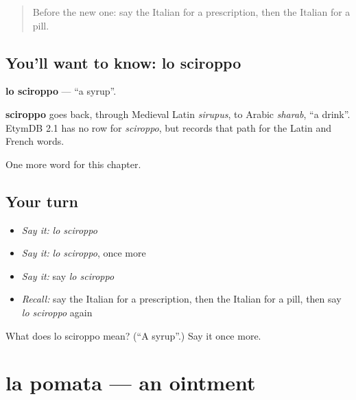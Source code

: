 \label{lesson:IT-C215-sciroppo}



\begin{quote}
Before the new one: say the Italian for a prescription, then the Italian for a pill.
\end{quote}

\subsection*{You'll want to know: lo sciroppo}
\textbf{lo sciroppo} — \textquotedblleft{}a syrup\textquotedblright{}.

\begin{cousinweb}
\textbf{sciroppo} goes back, through Medieval Latin \emph{sirupus}, to Arabic \emph{sharab}, \textquotedblleft{}a drink\textquotedblright{}. EtymDB 2.1 has no row for \emph{sciroppo}, but records that path for the Latin and French words.
\end{cousinweb}

\begin{grammarlens}[title={What you've built}]
One more word for this chapter.
\end{grammarlens}

\subsection*{Your turn}
\begin{itemize}
\raggedright
  \item \emph{Say it:} \emph{lo sciroppo}
  \item \emph{Say it:} \emph{lo sciroppo}, once more
  \item \emph{Say it:} say \emph{lo sciroppo}
  \item \emph{Recall:} say the Italian for a prescription, then the Italian for a pill, then say \emph{lo sciroppo} again
\end{itemize}

\begin{tcolorbox}[breakable,colback=teal!4,colframe=teal!35!black,title={Before you move on}]
What does lo sciroppo mean? (\textquotedblleft{}A syrup\textquotedblright{}.) Say it once more.
\end{tcolorbox}
\section[la pomata]{la pomata — an ointment}

\label{lesson:IT-C215-pomata}



